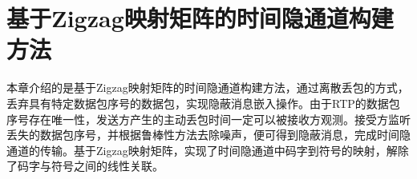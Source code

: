 \chapter{基于Zigzag映射矩阵的时间隐通道构建方法}
\label{chap:zigzag}

本章介绍的是基于Zigzag映射矩阵的时间隐通道构建方法，通过离散丢包的方式，丢弃具有特定数据包序号的数据包，实现隐蔽消息嵌入操作。由于RTP的数据包序号存在唯一性，发送方产生的主动丢包时间一定可以被接收方观测。接受方监听丢失的数据包序号，并根据鲁棒性方法去除噪声，便可得到隐蔽消息，完成时间隐通道的传输。基于Zigzag映射矩阵，实现了时间隐通道中码字到符号的映射，解除了码字与符号之间的线性关联。





